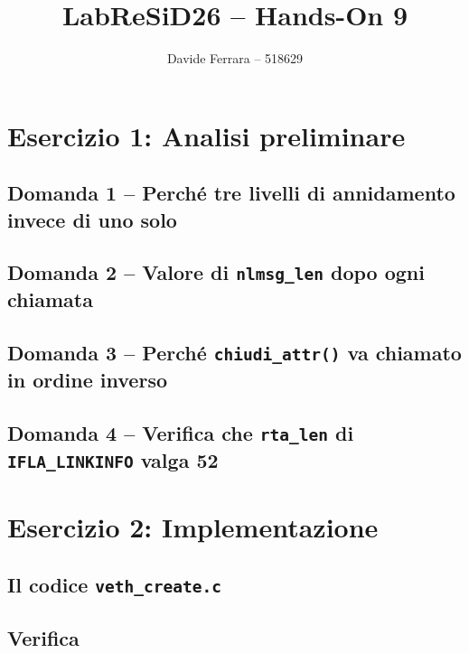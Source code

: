 \documentclass[a4paper,12pt]{article}
\title{LabReSiD26 -- Hands-On 9}
\author{Davide Ferrara -- 518629}
\date{}
\begin{document}
\maketitle

\section{Esercizio 1: Analisi preliminare}

\subsection*{Domanda 1 -- Perché tre livelli di annidamento invece di uno solo}


\subsection*{Domanda 2 -- Valore di \texttt{nlmsg\_len} dopo ogni chiamata}


\subsection*{Domanda 3 -- Perché \texttt{chiudi\_attr()} va chiamato in ordine inverso}


\subsection*{Domanda 4 -- Verifica che \texttt{rta\_len} di \texttt{IFLA\_LINKINFO} valga 52}


\section{Esercizio 2: Implementazione}

\subsection*{Il codice \texttt{veth\_create.c}}


\subsection*{Verifica}

\end{document}
